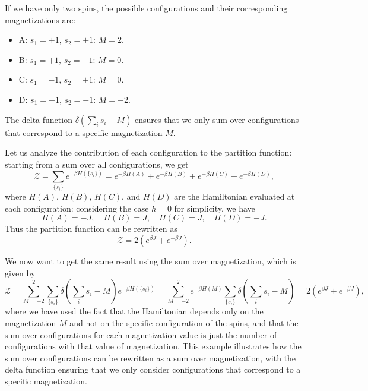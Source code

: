 \begin{example}[\(N=2\)]
    If we have only two spins, the possible configurations and their corresponding magnetizations are:
    \begin{itemize}
        \item A: \(s_1 = +1,\, s_2 = +1\): \(M = 2\).
        \item B: \(s_1 = +1,\, s_2 = -1\): \(M = 0\).
        \item C: \(s_1 = -1,\, s_2 = +1\): \(M = 0\).
        \item D: \(s_1 = -1,\, s_2 = -1\): \(M = -2\).
    \end{itemize}
    The delta function \(\delta\left(\sum_{i} s_i - M\right)\) ensures that we only sum over configurations that correspond to a specific magnetization \(M\).

    Let us analyze the contribution of each configuration to the partition function: starting from a sum over all configurations, we get
    \[
        \mathcal{Z} = \sum_{\{s_i\}} e^{-\beta H(\{s_i\})} = e^{- \beta H(A)} + e^{-\beta H(B)} + e^{-\beta H(C)} + e^{-\beta H(D)},
    \]
    where \(H(A)\), \(H(B)\), \(H(C)\), and \(H(D)\) are the Hamiltonian evaluated at each configuration: considering the case \(h=0\) for simplicity, we have
    \[
        H(A) = -J, \quad H(B) = J, \quad H(C) = J, \quad H(D) = -J.
    \]
    Thus the partition function can be rewritten as
    \[
        \mathcal{Z} = 2 (e^{\beta J} + e^{-\beta J}).
    \]

    We now want to get the same result using the sum over magnetization, which is given by
    \[
        \mathcal{Z} = \sum_{M = -2}^2 \sum_{\{s_i\}} \delta\left(\sum_{i} s_i - M\right) e^{-\beta H(\{s_i\})} = \sum_{M = -2}^2 e^{-\beta H(M)} \sum_{\{s_i\}} \delta\left(\sum_{i} s_i - M\right) = 2 (e^{\beta J} + e^{-\beta J}),
    \]
    where we have used the fact that the Hamiltonian depends only on the magnetization \(M\) and not on the specific configuration of the spins, and that the sum over configurations for each magnetization value is just the number of configurations with that value of magnetization. This example illustrates how the sum over configurations can be rewritten as a sum over magnetization, with the delta function ensuring that we only consider configurations that correspond to a specific magnetization.
\end{example}

